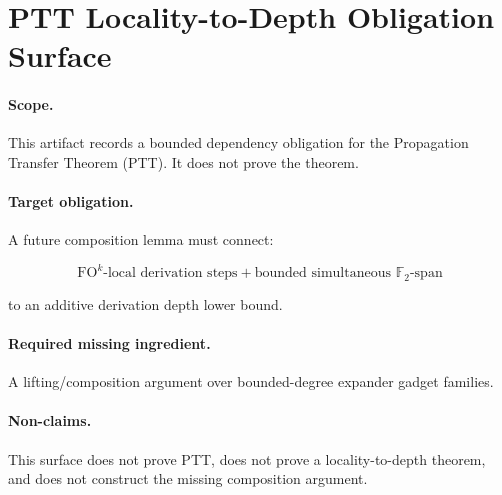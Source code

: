 \section{PTT Locality-to-Depth Obligation Surface}

\paragraph{Scope.}
This artifact records a bounded dependency obligation for the Propagation Transfer
Theorem (PTT). It does not prove the theorem.

\paragraph{Target obligation.}
A future composition lemma must connect:

\[
\text{FO}^{k}\text{-local derivation steps}
+
\text{bounded simultaneous } \mathbb{F}_2\text{-span}
\]

to an additive derivation depth lower bound.

\paragraph{Required missing ingredient.}
A lifting/composition argument over bounded-degree expander gadget families.

\paragraph{Non-claims.}
This surface does not prove PTT, does not prove a locality-to-depth theorem,
and does not construct the missing composition argument.
